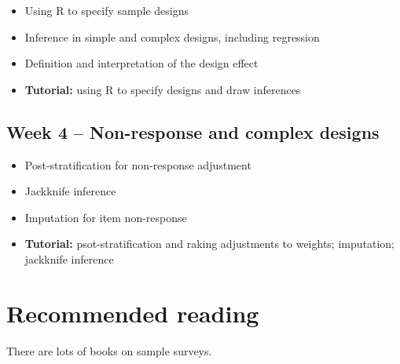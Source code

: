 \documentclass[
]{book}
\providecommand{\tightlist}{%
  \setlength{\itemsep}{0pt}\setlength{\parskip}{0pt}}
\begin{document}
\begin{itemize}
\tightlist
\item
  Using R to specify sample designs
\item
  Inference in simple and complex designs, including regression
\item
  Definition and interpretation of the design effect
\item
  \textbf{Tutorial:} using R to specify designs and draw inferences
\end{itemize}

\subsection*{Week 4 -- Non-response and complex designs}\label{week-4-non-response-and-complex-designs}

\begin{itemize}
\tightlist
\item
  Post-stratification for non-response adjustment
\item
  Jackknife inference
\item
  Imputation for item non-response
\item
  \textbf{Tutorial:} psot-stratification and raking adjustments to weights; imputation; jackknife inference
\end{itemize}

\section{Recommended reading}\label{recommended-reading}

There are lots of books on sample surveys.
\end{document}
